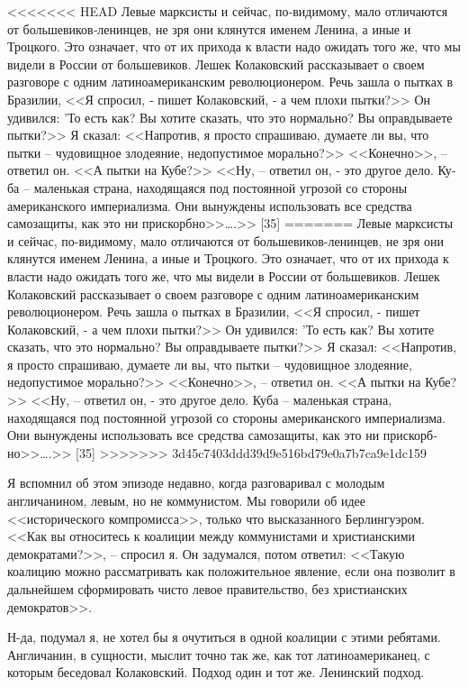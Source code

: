 \documentclass{book}
\begin{document}
{<<<<<<< HEAD
Левые марксисты и сейчас, по‑видимому, мало отличаются от большевиков‑ленинцев, не зря они клянутся именем Ленина, а иные и Троцкого. Это означает, что от их прихода к власти надо ожидать того же, что мы видели в России от большевиков. Лешек Колаковский рассказывает о своем разговоре с одним латиноамериканским революционером. Речь зашла о пытках в Бразилии, <<Я спросил, ‑ пишет Колаковский, ‑ а чем плохи пытки?>> Он удивился: 'То есть как? Вы хотите сказать, что это нормально? Вы оправдываете пытки?>> Я сказал: <<Напротив, я просто спрашиваю, думаете ли вы, что пытки -- чудовищное зло­деяние, недопустимое морально?>> <<Конечно>>, -- ответил он. <<А пытки на Кубе?>> <<Ну, -- ответил он, ‑ это другое дело. Ку­ба -- маленькая страна, находящаяся под постоянной угрозой со стороны американского империализма. Они вынуждены использовать все средства самозащиты, как это ни прискорб­но>>\ldots.>> [35]
=======
Левые марксисты и сейчас, по-видимому, мало отличаются от большевиков-ленинцев, не зря они клянутся именем Ленина, а иные и Троцкого. Это означает, что от их прихода к власти надо ожидать того же, что мы видели в России от большевиков. Лешек Колаковский рассказывает о своем разговоре с одним латиноамериканским революционером. Речь зашла о пытках в Бразилии, <<Я спросил, - пишет Колаковский, - а чем плохи пытки?>> Он удивился: 'То есть как? Вы хотите сказать, что это нормально? Вы оправдываете пытки?>> Я сказал: <<Напротив, я просто спрашиваю, думаете ли вы, что пытки -- чудовищное зло­деяние, недопустимое морально?>> <<Конечно>>, -- ответил он. <<А пытки на Кубе?>> <<Ну, -- ответил он, - это другое дело. Ку­ба -- маленькая страна, находящаяся под постоянной угрозой со стороны американского империализма. Они вынуждены использовать все средства самозащиты, как это ни прискорб­но>>\ldots.>> [35]
>>>>>>> 3d45c7403ddd39d9e516bd79e0a7b7ca9e1dc159

Я вспомнил об этом эпизоде недавно, когда разговаривал с молодым англичанином, левым, но не коммунистом. Мы го­ворили об идее <<исторического компромисса>>, только что вы­сказанного Берлингуэром. <<Как вы относитесь к коалиции меж­ду коммунистами и христианскими демократами?>>, -- спросил я. Он задумался, потом ответил: <<Такую коалицию можно рас­сматривать как положительное явление, если она позволит в дальнейшем сформировать чисто левое правительство, без христианских демократов>>.

Н-да, подумал я, не хотел бы я очутиться в одной коалиции с этими ребятами. Англичанин, в сущности, мыслит точно так же, как тот латиноамериканец, с которым беседовал Колаков­ский. Подход один и тот же. Ленинский подход.

}
\end{document}
